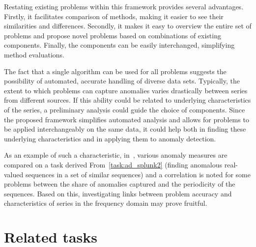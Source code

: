 Restating existing problems within this framework provides several advantages. Firstly, it facilitates comparison of methods, making it easier to see their similarities and differences. Secondly, it makes it easy to overview the entire set of problems and propose novel problems based on combinations of existing components. Finally, the components can be easily interchanged, simplifying method evaluations.

The fact that a single algorithm can be used for all problems suggests the possibility of automated, accurate handling of diverse data sets. Typically, the extent to which problems can capture anomalies varies drastically between series from different sources. If this ability could be related to underlying characteristics of the series, a preliminary analysis could guide the choice of components. Since the proposed framework simplifies automated analysis and allows for problems to be applied interchangeably on the same data, it could help both in finding these underlying characteristics and in applying them to anomaly detection.

As an example of such a characteristic, in~\cite{chandola3}, various anomaly measures are compared on a task derived From~\ref{task:ad_splunk2} (finding anomalous real-valued sequences in a set of similar sequences) and a correlation is noted for some problems between the share of anomalies captured and the periodicity of the sequences. Based on this, investigating links between problem accuracy and characteristics of series in the frequency domain may prove fruitful.

\section{Related tasks}
\label{sect:related_tasks_framework}

